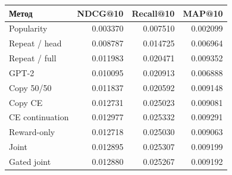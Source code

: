 \begin{tabular}{lrrr}\toprule
Метод & NDCG@10 & Recall@10 & MAP@10\\\midrule
Popularity & 0.003370 & 0.007510 & 0.002099 \\
Repeat / head & 0.008787 & 0.014725 & 0.006964 \\
Repeat / full & 0.011983 & 0.020471 & 0.009352 \\
GPT-2 & 0.010095 & 0.020913 & 0.006888 \\
Copy 50/50 & 0.011837 & 0.020592 & 0.009148 \\
Copy CE & 0.012731 & 0.025023 & 0.009081 \\
CE continuation & 0.012977 & 0.025332 & 0.009291 \\
Reward-only & 0.012718 & 0.025030 & 0.009063 \\
Joint & 0.012895 & 0.025307 & 0.009199 \\
Gated joint & 0.012880 & 0.025267 & 0.009192 \\
\bottomrule\end{tabular}
